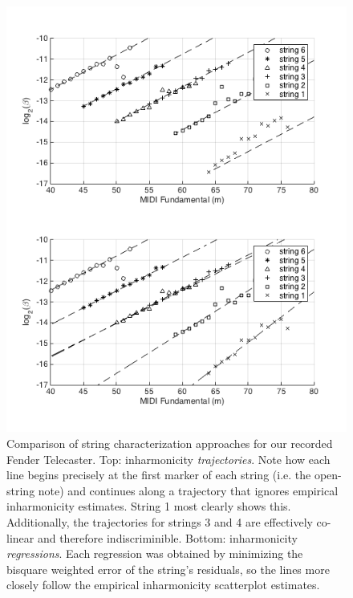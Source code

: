 \documentclass[12pt]{cmuthesis}
\begin{document}
\begin{figure}[!htbp] 
\centering
\includegraphics[scale=0.75]{traj-v-reg}
\caption{Comparison of string characterization approaches for our recorded Fender Telecaster. Top: inharmonicity \textit{trajectories}. Note how each line begins precisely at the first marker of each string (i.e. the open-string note) and continues along a trajectory that ignores empirical inharmonicity estimates. String 1 most clearly shows this. Additionally, the trajectories for strings 3 and 4 are effectively co-linear and therefore indiscriminible. Bottom: inharmonicity \textit{regressions}. Each regression was obtained by minimizing the bisquare weighted error of the string's residuals, so the lines more closely follow the empirical inharmonicity scatterplot estimates.}
\label{fig:traj-v-reg}
\end{figure}
\end{document}
